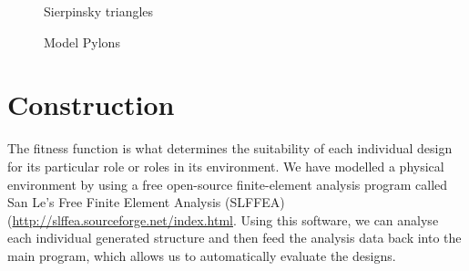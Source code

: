 \documentclass{sig-alternate}
\begin{document}
\begin{figure}
  \centering
  \hfil
  \caption{Sierpinsky triangles}
  \label{fig:sierpinsky_triangles}
\end{figure}

\begin{figure}
  \centering
  \hfil
  \hfil
  \caption{Model Pylons}
  \label{fig:pylons}
\end{figure}


\section*{Construction}

The fitness function is what determines the suitability of each
individual design for its particular role or roles in its
environment. We have modelled a physical environment by using a free
open-source finite-element analysis program called San Le's Free
Finite Element Analysis (SLFFEA)
(\url{http://slffea.sourceforge.net/index.html}. Using this software,
we can analyse each individual generated structure and then feed the
analysis data back into the main program, which allows us to
automatically evaluate the designs.
\end{document}
